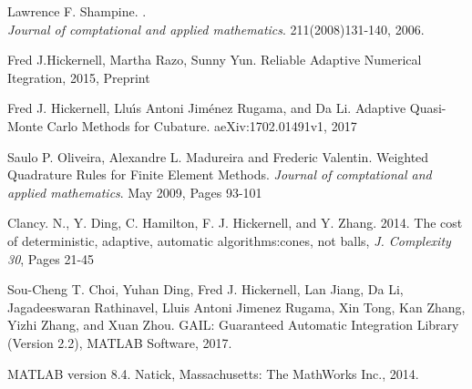 \documentclass{iitthesis}
\begin{document}
\begin{thebibliography}{9}

 
Lawrence F. Shampine.
.\\
\textit{Journal of comptational and applied mathematics}. 211(2008)131-140, 2006.
 
Fred J.Hickernell, Martha Razo, Sunny Yun. Reliable Adaptive Numerical Itegration, 2015, Preprint

Fred J. Hickernell, Llu{\'\i}s Antoni Jim{\'e}nez Rugama, and Da Li. Adaptive Quasi-Monte Carlo Methods for Cubature.
aeXiv:1702.01491v1, 2017

Saulo P. Oliveira, Alexandre L. Madureira and Frederic Valentin.
Weighted Quadrature Rules for Finite Element Methods. 
\textit{Journal of comptational and applied mathematics}. May 2009, Pages 93-101

Clancy. N., Y. Ding, C. Hamilton, F. J. Hickernell, and Y. Zhang. 2014. The cost of deterministic, adaptive, automatic algorithms:cones, not balls, \textit{J. Complexity 30}, Pages 21-45


Sou-Cheng T. Choi, Yuhan Ding, Fred J. Hickernell, Lan Jiang, Da Li, Jagadeeswaran Rathinavel, Lluis Antoni Jimenez Rugama, Xin Tong, Kan Zhang, Yizhi Zhang, and Xuan Zhou.  GAIL: Guaranteed Automatic Integration Library (Version 2.2), MATLAB Software, 2017.

MATLAB version 8.4. Natick, Massachusetts: The MathWorks Inc., 2014.


\end{thebibliography}
\end{document}
